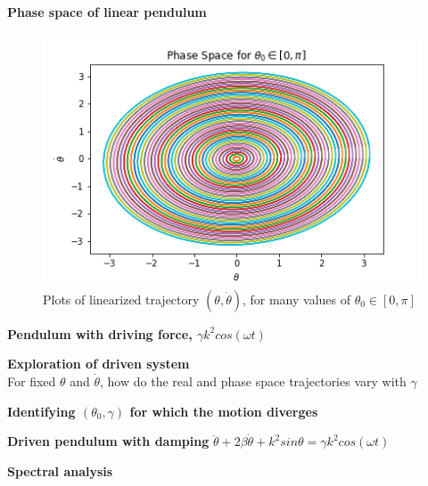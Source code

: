 \documentclass[12pt]{article}
\newenvironment{problem}[2][]{\begin{trivlist}
\item[\hskip \labelsep {\bfseries #1}\hskip \labelsep {\bfseries #2.}]}{\end{trivlist}}
\begin{document}
\begin{problem}{2}
	\textbf{Phase space of linear pendulum}
\begin{figure}[h!]
\centering
  \includegraphics[scale=0.6]{../figures/phaseSpaceLinear.png}
  \caption{Plots of linearized trajectory $(\theta,\dot{\theta})$, for many values of $\theta_{0} \in [0,\pi]$}
  \label{phaseLin}
\end{figure}
\end{problem}

\begin{problem}{3}
	\textbf{Pendulum with driving force, $\gamma k^{2}cos(\omega t)$}
\end{problem}

\begin{problem}{4}
	\textbf{Exploration of driven system} \\
	For fixed $\theta$ and $\dot{\theta}$, how do the real and phase space trajectories vary with $\gamma$
\end{problem}

\begin{problem}{5}
	\textbf{Identifying $(\theta_{0},\gamma)$ for which the motion diverges}
\end{problem}

\begin{problem}{6}
	\textbf{Driven pendulum with damping} $\ddot{\theta}+2\beta\dot{\theta}+k^{2}sin\theta=\gamma k^{2}cos(\omega t)$ \\

\end{problem}

\begin{problem}{7}
	\textbf{Spectral analysis}
\end{problem}
\end{document}
